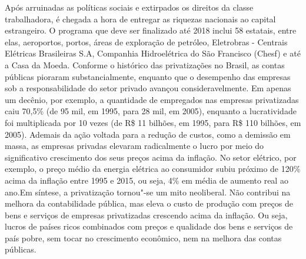 Após arruinadas as políticas sociais e extirpados os direitos da classe
trabalhadora, é chegada a hora de entregar as riquezas nacionais ao
capital estrangeiro. O programa que deve ser finalizado até 2018 inclui
58 estatais, entre elas, aeroportos, portos, áreas de exploração de
petróleo, Eletrobras - Centrais Elétricas Brasileiras S.A, Companhia
Hidroelétrica do São Francisco (Chesf) e até a Casa da Moeda. Conforme o
histórico das privatizações no Brasil, as contas públicas pioraram
substancialmente, enquanto que o desempenho das empresas sob a
responsabilidade do setor privado avançou consideravelmente. Em apenas
um decênio, por exemplo, a quantidade de empregados nas empresas
privatizadas caiu 70,5\% (de 95 mil, em 1995, para 28 mil, em 2005),
enquanto a lucratividade foi multiplicada por 10 vezes (de R\$ 11
bilhões, em 1995, para R\$ 110 bilhões, em 2005). Ademais da ação
voltada para a redução de custos, como a demissão em massa, as empresas
privadas elevaram radicalmente o lucro por meio do significativo
crescimento dos seus preços acima da inflação. No setor elétrico, por
exemplo, o preço médio da energia elétrica ao consumidor subiu próximo
de 120\% acima da inflação entre 1995 e 2015, ou seja, 4\% em média de
aumento real ao ano.Em síntese, a privatização tornou"-se um mito
neoliberal. Não contribui na melhora da contabilidade pública, mas eleva
o custo de produção com preços de bens e serviços de empresas
privatizadas crescendo acima da inflação. Ou seja, lucros de países
ricos combinados com preços e qualidade dos bens e serviços de país
pobre, sem tocar no crescimento econômico, nem na melhora das contas
públicas.

